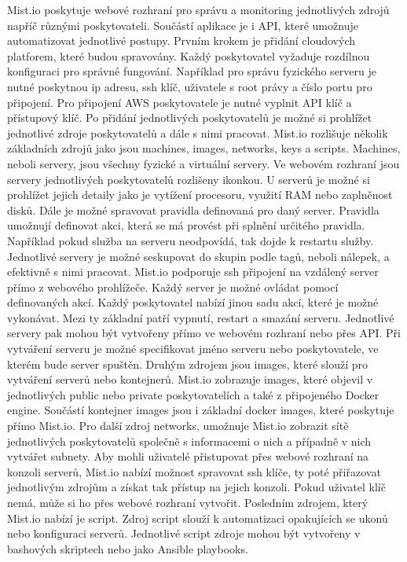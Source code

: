     Mist.io poskytuje webové rozhraní pro správu a monitoring jednotlivých zdrojů \linebreak napříč různými poskytovateli. Součástí aplikace je i API, které umožnuje automatizovat jednotlivé postupy. Prvním krokem je přidání cloudových platforem, které budou \linebreak spravovány. Každý poskytovatel vyžaduje rozdílnou konfiguraci pro správné \linebreak fungování. Například pro správu fyzického serveru je nutné poskytnou ip adresu, ssh klíč, uživatele s root právy a číslo portu pro připojení. Pro připojení AWS poskytovatele je nutné vyplnit API klíč a přístupový klíč. Po přidání jednotlivých poskytovatelů je možné si prohlížet jednotlivé zdroje poskytovatelů a dále s nimi pracovat. Mist.io rozlišuje několik základních zdrojů jako jsou machines, images, networks, keys a scripts. Machines, neboli servery, jsou všechny fyzické a virtuální servery. Ve webovém rozhraní jsou servery jednotlivých poskytovatelů rozlišeny ikonkou. U serverů je možné si prohlížet jejich detaily jako je vytížení procesoru, využití RAM nebo \linebreak zaplněnost disků. Dále je možné spravovat pravidla definovaná pro daný server. \linebreak Pravidla umožnují definovat akci, která se má provést při splnění určitého pravidla. Například pokud služba na serveru neodpovídá, tak dojde k restartu služby. Jednotlivé servery je možné seskupovat do skupin podle tagů, neboli nálepek, a efektivně s nimi pracovat. Mist.io podporuje ssh připojení na vzdálený server přímo z webového prohlížeče. Každý server je možné ovládat pomocí definovaných akcí. Každý poskytovatel nabízí jinou sadu akcí, které je možné vykonávat. Mezi ty základní patří vypnutí, restart a smazání serveru. Jednotlivé servery pak mohou být vytvořeny přímo ve webovém rozhraní nebo přes API. Při vytváření serveru je možné specifikovat jméno serveru nebo poskytovatele, ve kterém bude server spuštěn. Druhým zdrojem jsou images, které slouží pro vytváření serverů nebo kontejnerů. Mist.io zobrazuje images, které objevil v jednotlivých public nebo private poskytovatelích a také z připojeného Docker engine. Součástí kontejner images jsou i základní docker images, které poskytuje přímo Mist.io. Pro další zdroj networks, umožnuje Mist.io zobrazit sítě jednotlivých poskytovatelů společně s informacemi o nich a případně v nich vytvářet subnety.  Aby mohli uživatelé přistupovat přes webové rozhraní na konzoli serverů, Mist.io nabízí možnost spravovat ssh klíče, ty poté přiřazovat jednotlivým zdrojům a získat tak přístup na jejich konzoli. Pokud uživatel klíč nemá, může si ho přes webové rozhraní vytvořit. Posledním zdrojem, který Mist.io nabízí je script. Zdroj script slouží k automatizaci opakujících se ukonů nebo konfiguraci serverů. Jednotlivé script zdroje mohou být vytvořeny v bashových skriptech nebo jako Ansible playbooks. 

